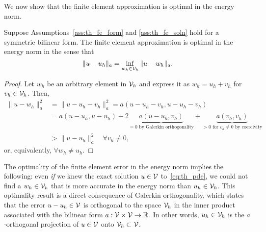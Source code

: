 We now show that the finite element approximation is optimal in the energy norm.
\begin{proposition}
  \label{prop:th_energy_bound}
  Suppose Assumptions~\ref{ass:th_fe_form} and \ref{ass:th_fe_soln} hold for a symmetric bilinear form.   The finite element approximation is optimal in the energy norm in the sense that
  \begin{equation}
    \| u - u_h \|_a = \inf_{w_h \in \mathcal{V}_h} \| u - w_h \|_a.
    \label{eq:th_energy_bound}
  \end{equation}
  \begin{proof}
    Let $w_h$ be an arbitrary element in $\mathcal{V}_h$ and express it as $w_h = u_h + v_h$ for $v_h \in \mathcal{V}_h$.  Then,
\begin{align*}
  \| u - w_h \|_a^2 &= \| u - u_h - v_h \|_a^2
  = a(u - u_h - v_h, u - u_h - v_h) \\
  &= a(u - u_h, u - u_h) - 2 \underbrace{ a(u - u_h, v_h) }_{= 0 \text{ by Galerkin orthogonality}} + \underbrace{ a(v_h,v_h) }_{> 0 \text{ for $v_h \neq 0$ by coercivity}}
  \\
  &> \| u - u_h \|_a^2 \quad \forall v_h \neq 0, %
\end{align*}
or, equivalently, $\forall w_h \neq u_h$.
  \end{proof}
\end{proposition}
The optimality of the finite element error in the energy norm implies the following: even \emph{if} we knew the exact solution $u \in \mathcal{V}$ to~\eqref{eq:th_pde}, we could not find a $w_h \in \mathcal{V}_h$ that is more accurate in the energy norm than $u_h \in \mathcal{V}_h$. This optimality result is a direct consequence of Galerkin orthogonality, which states that the error $u - u_h \in \mathcal{V}$ is orthogonal to the space $\mathcal{V}_h$ in the inner product associated with the bilinear form $a: \mathcal{V} \times \mathcal{V} \to \mathbb{R}$. In other words, $u_h \in \mathcal{V}_h$ is the $a$-orthogonal projection of $u \in \mathcal{V}$ onto $\mathcal{V}_h \subset \mathcal{V}$.

